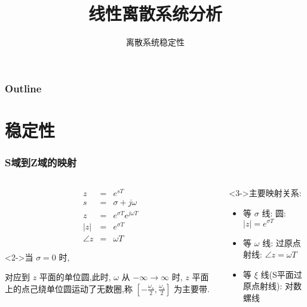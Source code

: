 \documentclass[table]{beamer}
\subtitle{离散系统稳定性}
\title{线性离散系统分析}
\author{}
\date{}
\begin{document}
\maketitle

\begin{frame}
\frametitle{Outline}
\setcounter{tocdepth}{3}
\tableofcontents
\end{frame}













\section{稳定性}
\label{sec-1}
\begin{frame}
\frametitle{S域到Z域的映射}
\label{sec-1-1}
\begin{columns}
\begin{column}{0.5\textwidth}
\label{sec-1-1-1}

\begin{eqnarray*}
z & = & e^{sT}\\
s &=& \sigma+j\omega \\
z &=& e^{\sigma T}e^{j\omega T} \\
|z| &=& e^{\sigma T} \\
\angle z &=& \omega T
\end{eqnarray*}
\begin{block}<2->{当  $\sigma=0$  时,}
\label{sec-1-1-1-1}

对应到  $z$  平面的单位圆,此时,  $\omega$  从  $-\infty\rightarrow\infty$ 时,  $z$  平面上的点己绕单位圆运动了无数圈,称  $[-\frac{\omega_s}{2},\frac{\omega_s}{2}]$  为主要带.
\end{block}
\end{column}
\begin{column}{0.5\textwidth}
\begin{block}<3->{主要映射关系:}
\label{sec-1-1-2}

\begin{itemize}
\item 等  $\sigma$  线: 圆:   $|z|=e^{\sigma T}$
\item 等  $\omega$  线: 过原点射线:  $\angle z=\omega T$
\item 等  $\xi$  线(S平面过原点射线): 对数螺线
\end{itemize}
\end{block}
\end{column}
\end{columns}
\end{frame}
\end{document}
